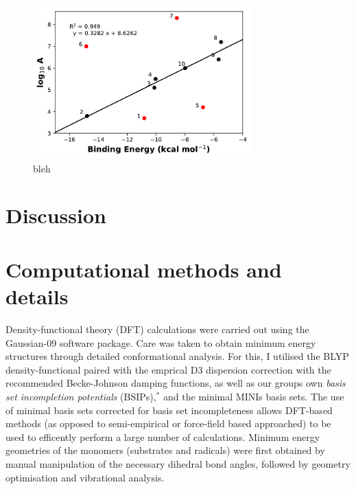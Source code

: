 \begin{figure}[htb]
  \centering
  \includegraphics[width=0.75\textwidth]{figures/arrhenius-scatter.pdf}
  \caption[bleh]{bleh}
\label{fig:Arrhenius}
\end{figure}

\section{Discussion}



\section{Computational methods and details}

Density-functional theory (DFT) calculations were carried out using the Gaussian-09 software package.\cite{Frisch2009} Care was taken to obtain minimum energy structures through detailed conformational analysis. For this, I utilised the BLYP density-functional\cite{Becke1988,Lee1988} paired with the emprical D3 dispersion correction\cite{Grimme2010} with the recommended Becke-Johnson damping functions,\cite{Johnson2006} as well as our groups own \emph{basis set incompletion potentials} (BSIPs),$^*$ and the minimal MINIs basis sets.\cite{Huzinaga1984} The use of minimal basis sets corrected for basis set incompleteness allows DFT-based methods (as opposed to semi-empirical or force-field based approached) to be used to efficently perform a large number of calculations. Minimum energy geometries of the monomers (substrates and radicals) were first obtained by manual manipulation of the necessary dihedral bond angles, followed by geometry optimisation and vibrational analysis.

